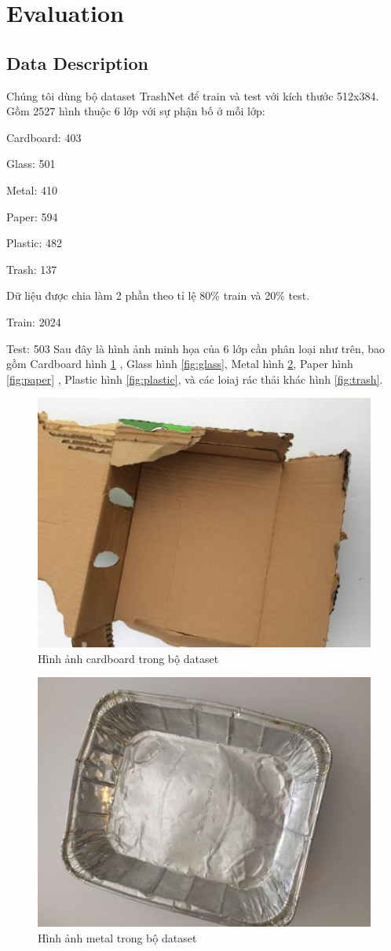 \section{Evaluation}
\subsection{Data Description} %
Chúng tôi dùng bộ dataset TrashNet \cite{trashnet} để train và test với kích thước 512x384.
Gồm 2527 hình thuộc 6 lớp với sự phận bố ở mỗi lớp:
 
Cardboard: 403

Glass: 501

Metal: 410

Paper: 594

Plastic: 482

Trash: 137
 
Dữ liệu được chia làm 2 phần theo tỉ lệ 80\% train và 20\% test.

Train: 2024

Test: 503
Sau đây là hình ảnh minh họa của 6 lớp cần phân loại như trên, bao gồm Cardboard hình \ref{fig:cardboard} , Glass hình \ref{fig:glass}, Metal hình \ref{fig:metal}, Paper hình \ref{fig:paper} , Plastic hình \ref{fig:plastic}, và các loiaj rác thải khác hình \ref{fig:trash}.
\begin{figure}[ht]
    \centering
    \includegraphics[width=0.25\linewidth]{images/Quanh/cardboard174.jpg}
    \caption{Hình ảnh cardboard trong bộ dataset}
    \label{fig:cardboard}
\end{figure}

\begin{figure}[H]
    \centering
    \includegraphics[width=0.25\linewidth]{images/Quanh/metal5.jpg}
    \caption{Hình ảnh metal trong bộ dataset}
    \label{fig:metal}
\end{figure}

